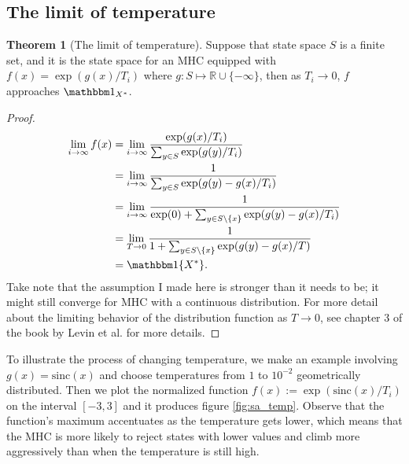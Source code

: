 \documentclass[]{article}
\theoremstyle{definition}
\newtheorem{theorem}{Theorem}       %
\begin{document}
    \subsection{The limit of temperature}
        \begin{theorem}[The limit of temperature]
            Suppose that state space $S$ is a finite set, and it is the state space for an MHC equipped with $f(x) = \exp(g(x)/T_i)$ where $g:S \mapsto \mathbb R \cup \{-\infty\}$, then as $T_i\rightarrow 0$, $f$ approaches $\mathbbm 1_{X^*}$. 
        \end{theorem}
        \begin{proof}
            \begin{align*}
                \lim_{i\rightarrow \infty}f(x) 
                &= 
                \lim_{i\rightarrow \infty} \frac{\exp(g(x)/T_i)}
                {
                    \sum_{y\in S}^{}
                    \exp(g(y)/T_i)
                }
                \\
                &= 
                \lim_{i\rightarrow \infty}
                \frac{1}{\sum_{y\in S}^{}\exp(g(y) - g(x)/T_i)}
                \\
                &= 
                \lim_{i\rightarrow \infty}
                \frac{1}{\exp(0) + \sum_{y\in S\setminus\{x\}}^{}\exp(g(y) - g(x)/T_i)}
                \\
                &= 
                \lim_{T\rightarrow 0}
                \frac{1}{1 + \sum_{y\in S\setminus\{x\}}^{}\exp(g(y) - g(x)/T)}
                \\
                &= \mathbbm 1\{X^*\}. 
            \end{align*}
            Take note that the assumption I made here is stronger than it needs to be; it might still converge for MHC with a continuous distribution. For more detail about the limiting behavior of the distribution function as $T\rightarrow 0$, see chapter 3 of the book by Levin et al. \cite {book:mkv_mix_time} for more details. 
        \end{proof}
        To illustrate the process of changing temperature, we make an example involving $g(x) = \text{sinc}(x)$ and choose temperatures from $1$ to $10^{-2}$ geometrically distributed. Then we plot the normalized function $f(x):= \exp(\text{sinc}(x)/T_i)$ on the interval $[-3, 3]$ and it produces figure \ref*{fig:sa_temp}. Observe that the function's maximum accentuates as the temperature gets lower, which means that the MHC is more likely to reject states with lower values and climb more aggressively than when the temperature is still high. 
\end{document}
